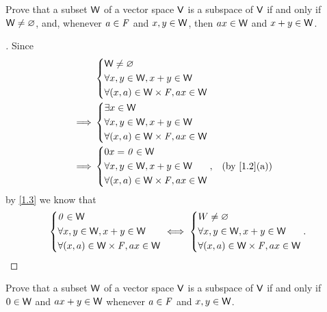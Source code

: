 \begin{ex}\label{ex:1.3.17}
  Prove that a subset \(\mathsf{W}\) of a vector space \(\mathsf{V}\) is a subspace of \(\mathsf{V}\) if and only if \(\mathsf{W} \neq \varnothing\), and, whenever \(a \in \mathit{F}\) and \(x, y \in \mathsf{W}\), then \(ax \in \mathsf{W}\) and \(x + y \in \mathsf{W}\).
\end{ex}

\begin{proof}[]
  Since
  \begin{align*}
             & \begin{dcases}
      \W \neq \varnothing               \\
      \forall x, y \in \W, x + y \in \W \\
      \forall (x, a) \in \W \times \F, ax \in \W
    \end{dcases}                                 \\
    \implies & \begin{dcases}
      \exists x \in \W                  \\
      \forall x, y \in \W, x + y \in \W \\
      \forall (x, a) \in \W \times \F, ax \in \W
    \end{dcases}                                 \\
    \implies & \begin{dcases}
      0x = \zv \in \W                   \\
      \forall x, y \in \W, x + y \in \W \\
      \forall (x, a) \in \W \times \F, ax \in \W
    \end{dcases}, &  & \text{(by \cref{1.2}(a))}
  \end{align*}
  by \cref{1.3} we know that
  \[
    \begin{dcases}
      \mathit{0} \in \mathsf{W}                        \\
      \forall x, y \in \mathsf{W}, x + y \in \mathsf{W} \\
      \forall (x, a) \in \mathsf{W} \times \mathit{F}, ax \in \mathsf{W}
    \end{dcases} \iff \begin{dcases}
      W \neq \varnothing                \\
      \forall x, y \in \mathsf{W}, x + y \in \mathsf{W} \\
      \forall (x, a) \in \mathsf{W} \times \mathit{F}, ax \in \mathsf{W}
    \end{dcases}.
  \]
\end{proof}

\begin{ex}\label{ex:1.3.18}
  Prove that a subset \(\mathsf{W}\) of a vector space \(\mathsf{V}\) is a subspace of \(\mathsf{V}\) if and only if \(0 \in \mathsf{W}\) and \(ax + y \in \mathsf{W}\) whenever \(a \in \mathit{F}\) and \(x, y \in \mathsf{W}\).
\end{ex}

